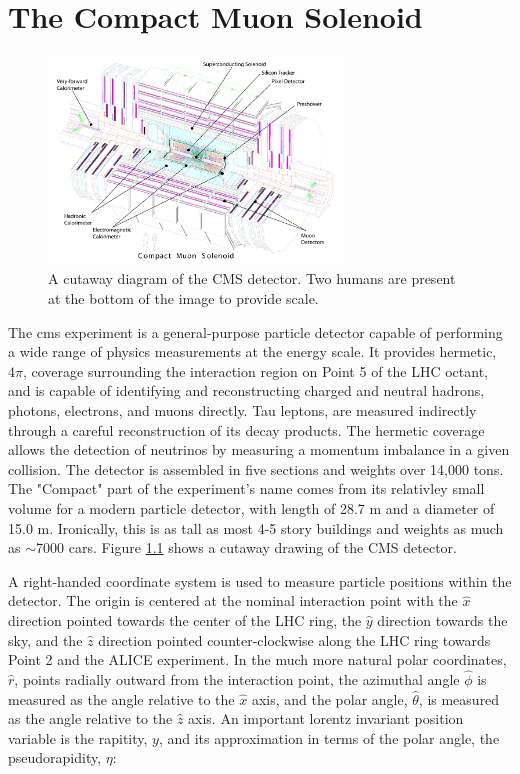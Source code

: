 \chapter{The Compact Muon Solenoid}
\label{cms_description_overview}

\begin{figure}[h]
   \centering
  \includegraphics[width=0.7\textwidth]{Figures/CMS_Diagrams/CMS__Complete_Labelled.pdf}
  \caption{A cutaway diagram of the CMS detector.  Two humans are
    present at the bottom of the image to provide scale.} \label{fig:cms_complete}
\end{figure}

\par The \acrfull{cms} experiment is a general-purpose particle
detector capable of performing a wide range of physics measurements at
the \TeV energy scale.  It provides hermetic, $4\pi$, coverage
surrounding the interaction region on Point 5 of the LHC octant, and
is capable of identifying and reconstructing charged and neutral
hadrons, photons, electrons, and muons directly.  Tau leptons, are
measured indirectly through a careful reconstruction of its decay
products.  The hermetic coverage allows the detection of neutrinos by
measuring a momentum imbalance in a given collision.  The detector is
assembled in five sections and weights over 14,000 tons.  The
"Compact" part of the experiment's name comes from its relativley
small volume for a modern particle detector, with length of 28.7 m
and a diameter of 15.0 m.  Ironically, this is as tall as most 4-5
story buildings and weights as much as $\sim$7000 cars.  Figure
\ref{fig:cms_complete} shows a cutaway drawing of the CMS detector.  

\par A right-handed coordinate system is used to measure particle
positions within the detector.  The origin is centered at the nominal
interaction point with the $\hat{x}$ direction pointed towards the
center of the LHC ring, the $\hat{y}$ direction towards the sky, and
the $\hat{z}$ direction pointed counter-clockwise along the LHC ring
towards Point 2 and the ALICE experiment.  In the much more natural
polar coordinates, $\hat{r}$, points radially outward from the
interaction point, the azimuthal angle $\hat{\phi}$ is measured as the
angle relative to the $\hat{x}$ axis, and the polar angle,
$\hat{\theta}$, is measured as the angle relative to the $\hat{z}$
axis.  An important lorentz invariant position variable is the
rapitity, $y$, and its approximation in terms of the polar angle, the
pseudorapidity, $\eta$:

